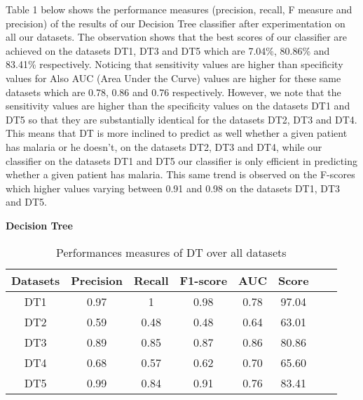 \documentclass[10pt,a4paper]{article}
\begin{document}
Table 1  below shows the performance measures (precision, recall, F measure and precision) of the results of our Decision Tree classifier after experimentation on all our datasets. The observation shows that the best scores of our classifier are achieved on the datasets DT1, DT3 and DT5 which are 7.04\%, 80.86\% and 83.41\% respectively. Noticing that sensitivity values are higher than specificity values for Also AUC (Area Under the Curve) values are higher for these same datasets which are 0.78, 0.86 and 0.76 respectively. However, we note that the sensitivity values are higher than the specificity values on the datasets DT1 and DT5 so that they are substantially identical for the datasets DT2, DT3 and DT4. This means that DT is more inclined to predict as well whether a given patient has malaria or he doesn’t, on the datasets DT2, DT3 and DT4, while our classifier on the datasets DT1 and DT5 our classifier is only efficient in predicting whether a given patient has malaria. This same trend is observed on the F-scores which higher values varying between 0.91 and 0.98 on the datasets DT1, DT3 and DT5.
\begin{center}
\textbf{Decision Tree}
\end{center}

\begin{table}[!ht]
\centering
\begin{tabular}{*{6}{c}l r}
  \toprule
  \textbf{Datasets} & \textbf{Precision} & \textbf{Recall} & \textbf{F1-score}&\textbf{AUC} &\textbf{Score}\\
   \midrule
  DT1 &0.97 & 1  & 0.98& 0.78&97.04 \\
  DT2 & 0.59 &0.48&0.48&0.64&63.01 \\
  DT3 &0.89 &0.85 &0.87&0.86&80.86\\
  DT4 &0.68 &0.57&0.62&0.70&65.60\\
  DT5 &0.99 &0.84&0.91&0.76&83.41\\

  
    \bottomrule
\end{tabular}
\caption{Performances measures of DT over all datasets}\label{perf-measure-dt1}
\end{table}
\end{document}
